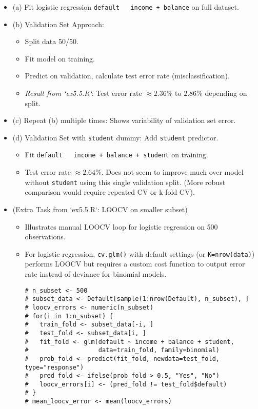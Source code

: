 \documentclass[12pt,a4paper]{article}
\newcommand{\Rfunction}[1]{\texttt{#1()}} %
\newcommand{\Rcode}[1]{\texttt{#1}} %
\begin{document}
\begin{itemize}
        \begin{itemize}
            \item (a) Fit logistic regression \Rcode{default ~ income + balance} on full dataset.
            \item (b) Validation Set Approach:
                \begin{itemize}
                    \item Split data 50/50.
                    \item Fit model on training.
                    \item Predict on validation, calculate test error rate (misclassification).
                    \item \textit{Result from `ex5.5.R`}: Test error rate $\approx 2.36\%$ to $2.86\%$ depending on split.
                \end{itemize}
            \item (c) Repeat (b) multiple times: Shows variability of validation set error.
            \item (d) Validation Set with \Rcode{student} dummy: Add \Rcode{student} predictor.
                \begin{itemize}
                    \item Fit \Rcode{default ~ income + balance + student} on training.
                    \item Test error rate $\approx 2.64\%$. Does not seem to improve much over model without \Rcode{student} using this single validation split. (More robust comparison would require repeated CV or k-fold CV).
                \end{itemize}
            \item (Extra Task from `ex5.5.R`: LOOCV on smaller subset)
                \begin{itemize}
                    \item Illustrates manual LOOCV loop for logistic regression on 500 observations.
                    \item For logistic regression, \Rfunction{cv.glm} with default settings (or \Rcode{K=nrow(data)}) performs LOOCV but requires a custom cost function to output error rate instead of deviance for binomial models.
\begin{lstlisting}[caption={Manual LOOCV for Classification Error (Conceptual)}]
# n_subset <- 500
# subset_data <- Default[sample(1:nrow(Default), n_subset), ]
# loocv_errors <- numeric(n_subset)
# for(i in 1:n_subset) {
#   train_fold <- subset_data[-i, ]
#   test_fold <- subset_data[i, ]
#   fit_fold <- glm(default ~ income + balance + student, 
#                   data=train_fold, family=binomial)
#   prob_fold <- predict(fit_fold, newdata=test_fold, type="response")
#   pred_fold <- ifelse(prob_fold > 0.5, "Yes", "No")
#   loocv_errors[i] <- (pred_fold != test_fold$default)
# }
# mean_loocv_error <- mean(loocv_errors)
\end{lstlisting}



\end{itemize}
\end{itemize}
\end{itemize}
\end{document}

